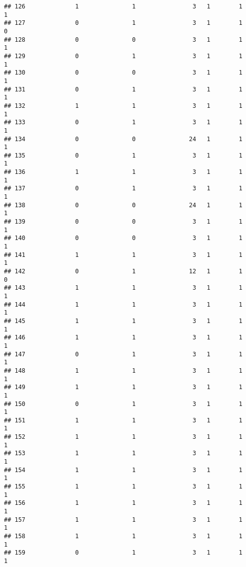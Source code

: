 \documentclass[]{article}
\begin{document}
\begin{verbatim}
## 126              1               1                3   1        1        1
## 127              0               1                3   1        1        0
## 128              0               0                3   1        1        1
## 129              0               1                3   1        1        1
## 130              0               0                3   1        1        1
## 131              0               1                3   1        1        1
## 132              1               1                3   1        1        1
## 133              0               1                3   1        1        1
## 134              0               0               24   1        1        1
## 135              0               1                3   1        1        1
## 136              1               1                3   1        1        1
## 137              0               1                3   1        1        1
## 138              0               0               24   1        1        1
## 139              0               0                3   1        1        1
## 140              0               0                3   1        1        1
## 141              1               1                3   1        1        1
## 142              0               1               12   1        1        0
## 143              1               1                3   1        1        1
## 144              1               1                3   1        1        1
## 145              1               1                3   1        1        1
## 146              1               1                3   1        1        1
## 147              0               1                3   1        1        1
## 148              1               1                3   1        1        1
## 149              1               1                3   1        1        1
## 150              0               1                3   1        1        1
## 151              1               1                3   1        1        1
## 152              1               1                3   1        1        1
## 153              1               1                3   1        1        1
## 154              1               1                3   1        1        1
## 155              1               1                3   1        1        1
## 156              1               1                3   1        1        1
## 157              1               1                3   1        1        1
## 158              1               1                3   1        1        1
## 159              0               1                3   1        1        1

\end{verbatim}
\end{document}
